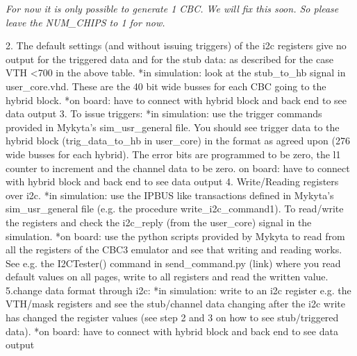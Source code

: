 \textit{For now it is only possible to generate 1 CBC.  We will fix this soon. So please leave the NUM_CHIPS to 1 for now.}

2. The default settings (and without issuing triggers) of the i2c registers give no output for the triggered data and for the stub data: as described for the case VTH <700 in the above table.
*in simulation: look at the stub_to_hb signal in user_core.vhd. These are the 40 bit wide busses for each CBC going to the hybrid block.
*on board: have to connect with hybrid block and back end to see data output
3. To issue triggers:
*in simulation: use the trigger commands provided in Mykyta’s sim_usr_general file. You should see trigger data to the hybrid block (trig_data_to_hb in user_core) in the format as agreed upon (276 wide busses for each hybrid). The error bits are programmed to be zero, the l1 counter to increment and the channel data to be zero.
on board: have to connect with hybrid block and back end to see data output
4. Write/Reading registers over i2c. 
*in simulation: use the IPBUS like transactions defined in Mykyta’s sim_usr_general file (e.g. the procedure write_i2c_command1). To read/write the registers and check the i2c_reply (from the user_core) signal in the simulation.
*on board: use the python scripts provided by Mykyta to read from all the registers of the CBC3 emulator and see that writing and reading works. See e.g. the I2CTester() command in send_command.py (link) where you read default values on all pages, write to all registers and read the written value.
5.change data format through i2c:
*in simulation: write to an i2c register e.g. the VTH/mask registers and see the stub/channel data changing after the i2c write has changed the register values (see step 2 and 3 on how to see stub/triggered data).
*on board: have to connect with hybrid block and back end to see data output